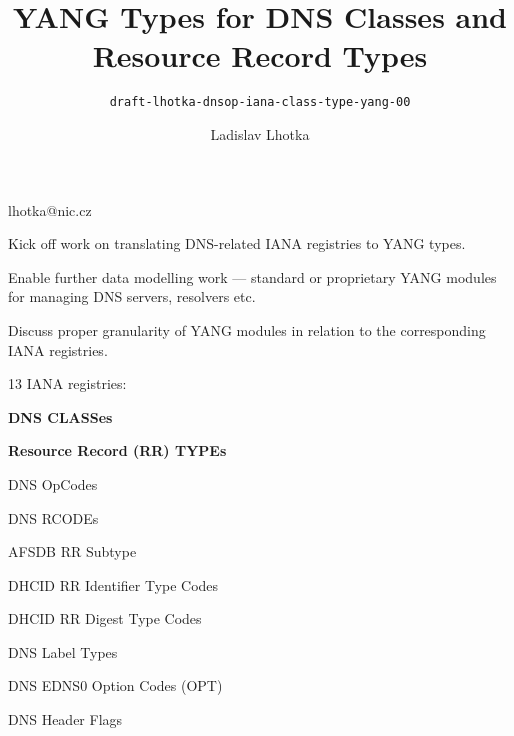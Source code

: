 

\def\prop{{\bf Proposal: }}
\def\opts{{\bf Options:}\numberList}
\let\endOpts=\endNumberList
\def\dstore#1{$\langle\hbox{#1}\rangle$}

\title{YANG Types for DNS Classes and Resource Record Types}
\subtitle{\normalSize\tt draft-lhotka-dnsop-iana-class-type-yang-00}

\author{Ladislav Lhotka}{lhotka@nic.cz}

\date [2018-11-05]

\slide[Objectives]

\bulletList

\item Kick off work on translating DNS-related IANA registries to YANG
types.

\item Enable further data modelling work --- standard or proprietary YANG
modules for managing DNS servers, resolvers etc.

\item Discuss proper granularity of YANG modules in relation to the
corresponding IANA registries.

\endBulletList



13 IANA registries:

\bulletList\tightList

\item {\bf DNS CLASSes}

\item {\bf Resource Record (RR) TYPEs}

\item DNS OpCodes

\item DNS RCODEs

\item AFSDB RR Subtype

\item DHCID RR Identifier Type Codes

\item DHCID RR Digest Type Codes

\item DNS Label Types

\item DNS EDNS0 Option Codes (OPT)

\item DNS Header Flags

